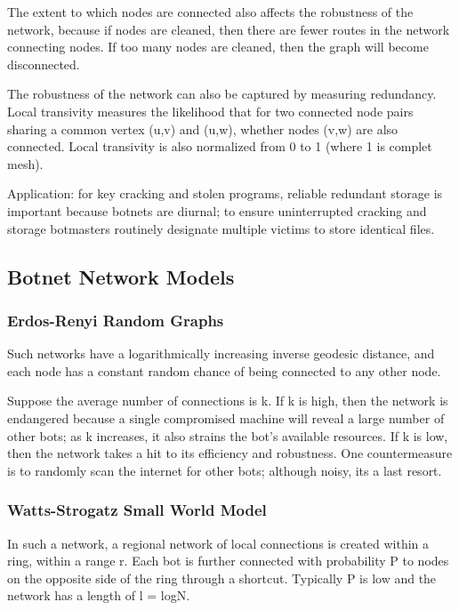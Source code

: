 \documentclass{article}
\begin{document}
The extent to which nodes are connected also affects the robustness of the network, because if nodes are cleaned, then there are fewer routes in the network connecting nodes. If too many nodes are cleaned, then the graph will become disconnected.

The robustness of the network can also be captured by measuring redundancy.  Local transivity measures the likelihood that for two connected node pairs sharing a common vertex (u,v) and (u,w), whether nodes (v,w) are also connected.  Local transivity is also normalized from 0 to 1 (where 1 is complet mesh).

Application: for key cracking and stolen programs, reliable redundant storage is important because botnets are diurnal; to ensure uninterrupted cracking and storage botmasters routinely designate multiple victims to store identical files.

\subsection{Botnet Network Models}

\subsubsection{Erdos-Renyi Random Graphs}


Such networks have a logarithmically increasing inverse geodesic distance, and each node has a constant random chance of being connected to any other node.

Suppose the average number of connections is k.  If k is high, then the network is endangered because a single compromised machine will reveal a large number of other bots; as k increases, it also strains the bot's available resources. If k is low, then the network takes a hit to its efficiency and robustness. One countermeasure is to randomly scan the internet for other bots; although noisy, its a last resort.

\subsubsection{Watts-Strogatz Small World Model}

In such a network, a regional network of local connections is created within a ring, within a range r.  Each bot is further connected with probability P to nodes on the opposite side of the ring through a shortcut.  Typically P is low and the network has a length of l = logN.
\end{document}
